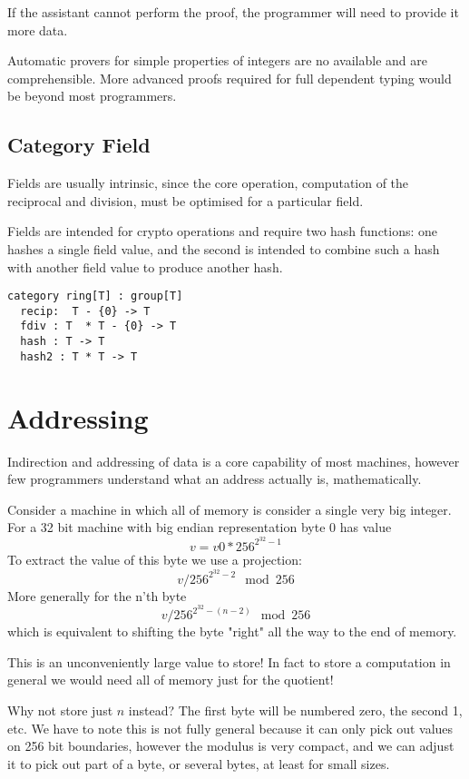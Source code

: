 \documentclass[oneside]{book}
\theoremstyle{plain}
\theoremstyle{definition}
\theoremstyle{plain}
\begin{document}
If the assistant cannot perform the proof, the programmer will
need to provide it more data.

Automatic provers for simple properties of integers are no available
and are comprehensible. More advanced proofs required for full
dependent typing would be beyond most programmers.


\section{Category Field}
Fields are usually intrinsic, since the core operation, computation
of the reciprocal and division, must be optimised for a particular
field.

Fields are intended for crypto operations and require two hash functions:
one hashes a single field value, and the second is intended to combine 
such a hash with another field value to produce another hash.

\begin{verbatim}
category ring[T] : group[T]
  recip:  T - {0} -> T
  fdiv : T  * T - {0} -> T
  hash : T -> T
  hash2 : T * T -> T
\end{verbatim}

\chapter{Addressing}
Indirection and addressing of data is a core capability of most machines,
however few programmers understand what an address actually is, mathematically.

Consider a machine in which all of memory is consider a single very big integer.
For a 32 bit machine with big endian representation byte 0 has value
$$v = v0 * 256 ^ {2^32 - 1}$$
To extract the value of this byte we use a projection:
$$v / 256 ^ {2^32 - 2} \mod 256$$
More generally for the n'th byte
$$v / 256 ^ {2^32 - (n - 2)} \mod 256$$
which is equivalent to shifting the byte "right" all the way to
the end of memory.

This is an unconveniently large value to store! In fact to store a computation
in general we would need all of memory just for the quotient!

Why not store just $n$ instead? The first byte will be numbered zero,
the second 1, etc. We have to note this is not fully general because
it can only pick out values on 256 bit boundaries, however the modulus
is very compact, and we can adjust it to pick out part of a byte, or
several bytes, at least for small sizes.
\end{document}
